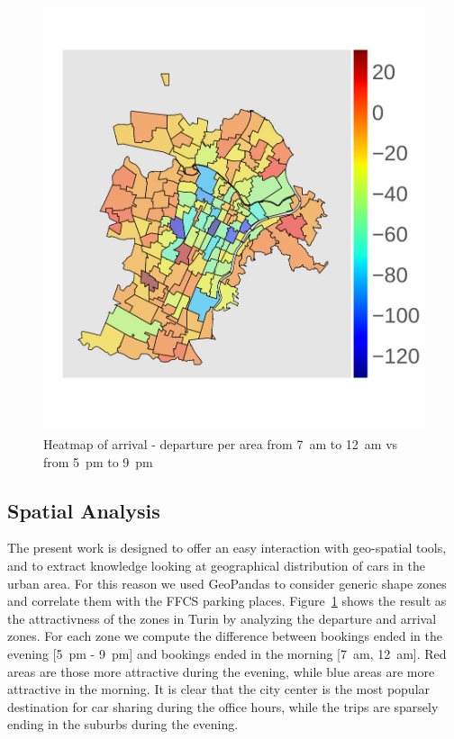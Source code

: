 \begin{figure}[t!]
\centering
\vspace{-10pt}
 \includegraphics[width=0.72\columnwidth]{figures/clorophlet_o_minus_o1.pdf}
 \vspace{-10pt}
 \caption{Heatmap of arrival - departure per area from 7~am to 12~am vs from 5~pm to 9~pm \label{fig:heatmap_arr_dep}}
\end{figure}


\subsection{Spatial Analysis}  


The present work is designed to offer an easy interaction with geo-spatial tools, and to extract knowledge looking at geographical distribution of cars in the urban area. For this reason we used GeoPandas to consider generic shape zones and correlate them with the FFCS parking places. Figure~\ref{fig:heatmap_arr_dep} shows the result as the attractivness of the  zones in Turin by analyzing the departure and arrival zones. For each zone we compute the difference between bookings ended in the evening [5~pm - 9~pm] and bookings ended in the morning [7~am, 12~am]. Red {areas are those} more attractive during the evening, while blue areas are more attractive in the morning. It is clear that the city center is the most popular destination for car sharing during the office hours, while the trips are sparsely ending in the suburbs during the evening.




